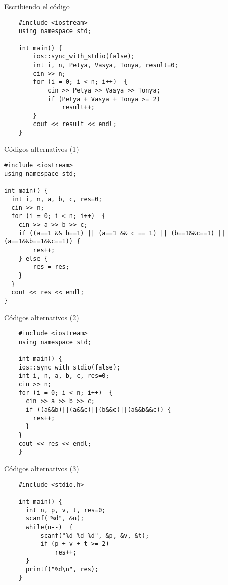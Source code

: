 \documentclass{beamer}
\begin{document}
\begin{frame}[fragile]{Escribiendo el código}
  \begin{lstlisting}
    #include <iostream>
    using namespace std;

    int main() {
        ios::sync_with_stdio(false);
        int i, n, Petya, Vasya, Tonya, result=0;
        cin >> n;
        for (i = 0; i < n; i++)  {
            cin >> Petya >> Vasya >> Tonya;
            if (Petya + Vasya + Tonya >= 2)
                result++;
        }
        cout << result << endl;
    }
  \end{lstlisting}
\end{frame}

\begin{frame}[fragile]{Códigos alternativos (1)}
  \begin{lstlisting}
#include <iostream>
using namespace std;

int main() {
  int i, n, a, b, c, res=0;
  cin >> n;
  for (i = 0; i < n; i++)  {
    cin >> a >> b >> c;
    if ((a==1 && b==1) || (a==1 && c == 1) || (b==1&&c==1) || (a==1&&b==1&&c==1)) {
	    res++;
    } else {
    	res = res;
    }
  }
  cout << res << endl;
}
  \end{lstlisting}
\end{frame}

\begin{frame}[fragile]{Códigos alternativos (2)}
  \begin{lstlisting}
    #include <iostream>
    using namespace std;

    int main() {
    ios::sync_with_stdio(false);
    int i, n, a, b, c, res=0;
    cin >> n;
    for (i = 0; i < n; i++)  {
      cin >> a >> b >> c;
      if ((a&&b)||(a&&c)||(b&&c)||(a&&b&&c)) {            
      	res++;
      }
    }
    cout << res << endl;
    }
  \end{lstlisting}
\end{frame}

\begin{frame}[fragile]{Códigos alternativos (3)}
  \begin{lstlisting}
    #include <stdio.h>

    int main() {
      int n, p, v, t, res=0;
      scanf("%d", &n);
      while(n--)  {
          scanf("%d %d %d", &p, &v, &t);
          if (p + v + t >= 2)
              res++;
      }
      printf("%d\n", res);
    }
  \end{lstlisting}
\end{frame}
\end{document}
